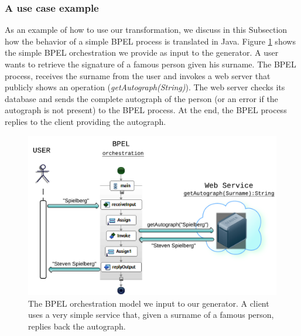 \subsubsection{A use case example}
As an example of how to use our transformation, we discuss in this Subsection how the behavior of a simple BPEL process is translated in Java. Figure \ref{fig:BPELOrchestr} shows the simple BPEL orchestration we provide as input to the generator. A user wants to retrieve the signature of a famous person given his surname. The BPEL process, receives the surname from the user and invokes a web server that publicly shows an operation (\textit{getAutograph(String)}). The web server checks its database and sends the complete autograph of the person (or an error if the autograph is not present) to the BPEL process. At the end, the BPEL process replies to the client providing the autograph.
\begin{figure}
  \begin{center}
    \includegraphics[scale=1.2]{pictures/UseCaseExampleBPELOrchestr.png}
    \caption{The BPEL orchestration model we input to our generator. A client uses a very simple service that, given a surname of a famous person, replies back the autograph.}
    \label{fig:BPELOrchestr}
  \end{center}
\end{figure}

